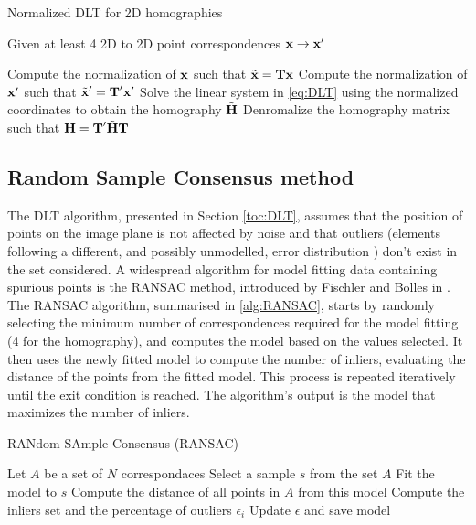 \begin{algorithm}
\caption{Normalized DLT for 2D homographies \cite{hartley2003multiple}}\label{alg:DLT}
\begin{algorithmic}[1]
\State Given at least 4 2D to 2D point correspondences $\mathrm{\textbf{x}}\rightarrow\mathrm{\textbf{x}}'$ 

\State Compute the normalization of $\mathrm{\textbf{x}}$ such that $\tilde{\mathrm{\textbf{x}}} = \mathrm{\textbf{T}}\mathrm{\textbf{x}}$ 
\State  Compute the normalization of $\mathrm{\textbf{x}}'$ such that $\tilde{\mathrm{\textbf{x}}}' = \mathrm{\textbf{T}}'\mathrm{\textbf{x}}'$ 
\State Solve the linear system in \cref{eq:DLT} using the normalized coordinates to obtain the homography $\tilde{\mathrm{\textbf{H}}}$
\State  Denromalize the homography matrix such that $\mathrm{\textbf{H}} = \mathrm{\textbf{T}}'\tilde{\mathrm{\textbf{H}}}\mathrm{\textbf{T}}$
\end{algorithmic}

\end{algorithm}

\subsection{Random Sample Consensus method}
\label{sec:RANSAC}
The DLT algorithm, presented in Section \ref{toc:DLT}, assumes that the position of points on the image plane is not affected by noise and that outliers (elements following a different, and possibly unmodelled,
error distribution \cite{hartley2003multiple}) don't exist in the set considered. A widespread algorithm for model fitting data containing spurious points is the RANSAC method, introduced by Fischler and Bolles in \cite{fischler1981random}.\\
The RANSAC algorithm, summarised in \cref{alg:RANSAC}, starts by randomly selecting the minimum number of correspondences required for the model fitting (4 for the homography), and computes the model based on the values selected. It then uses the newly fitted model to compute the number of inliers, evaluating the distance of the points from the fitted model. This process is repeated iteratively until the exit condition is reached. The algorithm's output is the model that maximizes the number of inliers. 
\begin{algorithm}
\caption{RANdom SAmple Consensus (RANSAC) \cite{fischler1981random}}\label{alg:RANSAC}
\begin{algorithmic}[1]
\State Let $A$ be a set of $N$ correspondaces
\State Select a sample $s$ from the set $A$
\State Fit the model to $s$
\State Compute the distance of all points in $A$ from this model
\State Compute the inliers set and the percentage of outliers $\epsilon_i$
\State Update $\epsilon$ and save model
\EndIf
\EndWhile
\end{algorithmic}
\end{algorithm}

